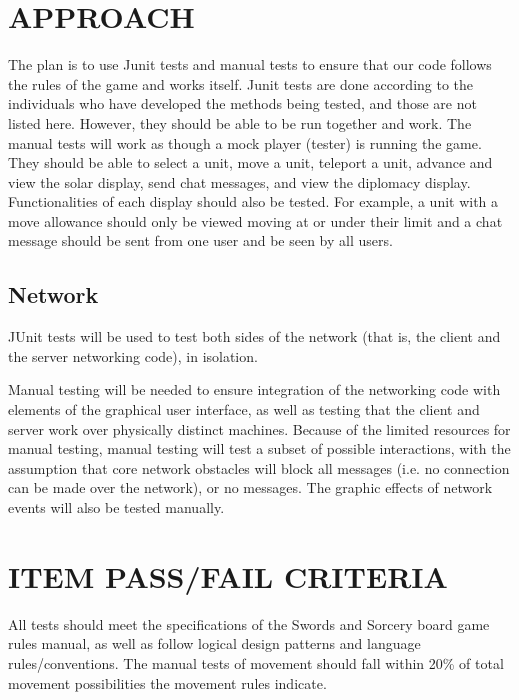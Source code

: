 \section[APPROACH]{\bfseries\color{black} APPROACH}
{\color{black}
The plan is to use Junit tests and manual tests to ensure that our code follows the rules of the game and works itself. Junit tests are done according to the individuals who have developed the methods being tested, and those are not listed here. However, they should be able to be run together and work. The manual tests will work as though a mock player (tester) is running the game. They should be able to select a unit, move a unit, teleport a unit, advance and view the solar display, send chat messages, and view the diplomacy display. Functionalities of each display should also be tested. For example, a unit with a move allowance should only be viewed moving at or under their limit and a chat message should be sent from one user and be seen by all users.
}

\subsection{Network}
JUnit tests will be used to test both sides of the network (that is,
the client and the server networking code), in isolation.

Manual testing will be needed to ensure integration of the networking
code with elements of the graphical user interface, as well as testing
that the client and server work over physically distinct machines.
Because of the limited resources for manual testing, manual testing
will test a subset of possible interactions, with the assumption that
core network obstacles will block all messages (i.e. no connection can
be made over the network), or no messages. The graphic effects of
network events will also be tested manually.


\section[ITEM PASS/FAIL CRITERIA]{\bfseries\color{black}
	 ITEM PASS/FAIL CRITERIA}
{\color{black}
All tests should meet the specifications of the Swords and Sorcery board game rules manual, as well as follow logical design patterns and language rules/conventions. The manual tests of movement should fall within 20\% of total movement possibilities the movement rules indicate.
}

